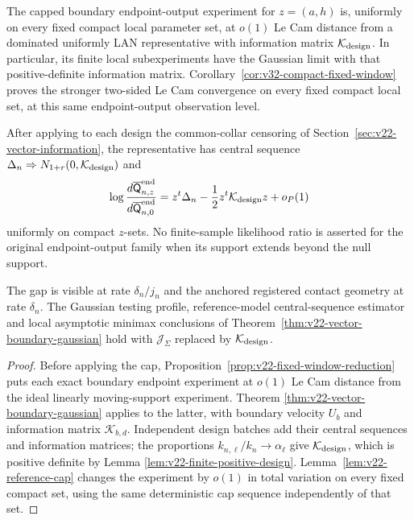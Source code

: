\begin{theorem}
\label{thm:v22-fixed-window-gaussian}
The capped boundary endpoint-output experiment for $z=(a,h)$ is, uniformly on
every fixed compact local parameter set, at $o(1)$ Le Cam distance from a
dominated uniformly LAN representative with information matrix
$\mathcal K_{\rm design}$.  In particular, its finite local subexperiments
have the Gaussian limit with that positive-definite information matrix.
Corollary~\ref{cor:v32-compact-fixed-window} proves the stronger two-sided
Le Cam convergence on every fixed compact local set, at this same
endpoint-output observation level.

After applying to each design the common-collar censoring of
Section~\ref{sec:v22-vector-information}, the representative has central
sequence $\Delta_n\Rightarrow
N_{1+r}(0,\mathcal K_{\rm design})$ and
\begin{equation}\label{eq:v22-physical-lan-representative}
 \log\frac{d\overline{\mathsf Q}_{n,z}^{\rm end}}
          {d\overline{\mathsf Q}_{n,0}^{\rm end}}
 =z^t\Delta_n-\frac12z^t\mathcal K_{\rm design}z+o_P(1)
\end{equation}
uniformly on compact $z$-sets.  No finite-sample likelihood ratio is asserted
for the original endpoint-output family when its support extends beyond the
null support.

The gap is visible at rate $\delta_n/j_n$ and the anchored registered contact
geometry at rate $\delta_n$.  The Gaussian testing profile, reference-model
central-sequence estimator and local asymptotic minimax conclusions of
Theorem~\ref{thm:v22-vector-boundary-gaussian} hold with
$\mathcal J_\Sigma$ replaced by $\mathcal K_{\rm design}$.
\end{theorem}

\begin{proof}
Before applying the cap, Proposition~\ref{prop:v22-fixed-window-reduction}
puts each exact boundary endpoint experiment at $o(1)$ Le Cam distance from
the ideal linearly moving-support experiment.  Theorem
\ref{thm:v22-vector-boundary-gaussian} applies to the latter, with boundary
velocity $U_b$ and information matrix $\mathcal K_{b,d}$.  Independent design
batches add their central sequences and information matrices; the proportions
$k_{n,\ell}/k_n\to\alpha_\ell$ give
$\mathcal K_{\rm design}$, which is positive definite by Lemma
\ref{lem:v22-finite-positive-design}.  Lemma~\ref{lem:v22-reference-cap}
changes the experiment by $o(1)$ in total variation on every fixed compact
set, using the same deterministic cap sequence independently of that set.
\end{proof}

